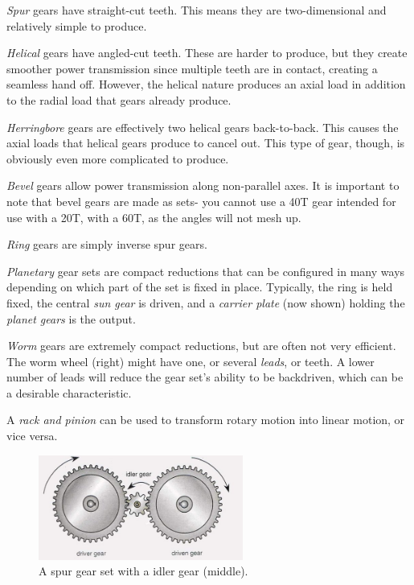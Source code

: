 \documentclass[10pt,letterpaper]{book}
\begin{document}
\begin{asparaenum}[a)]
	\item \textit{Spur} gears have straight-cut teeth. This means they are two-dimensional and relatively simple to produce.
	\item \textit{Helical} gears have angled-cut teeth. These are harder to produce, but they create smoother power transmission since multiple teeth are in contact, creating a seamless hand off. However, the helical nature produces an axial load in addition to the radial load that gears already produce. 
	\item \textit{Herringbore} gears are effectively two helical gears back-to-back. This causes the axial loads that helical gears produce to cancel out. This type of gear, though, is obviously even more complicated to produce.
	\item \textit{Bevel} gears allow power transmission along non-parallel axes. It is important to note that bevel gears are made as sets- you cannot use a 40T gear intended for use with a 20T, with a 60T, as the angles will not mesh up.
	\item \textit{Ring} gears are simply inverse spur gears.
	\item \textit{Planetary} gear sets are compact reductions that can be configured in many ways depending on which part of the set is fixed in place. Typically, the ring is held fixed, the central \textit{sun gear} is driven, and a \textit{carrier plate} (now shown) holding the \textit{planet gears} is the output.
	\item \textit{Worm} gears are extremely compact reductions, but are often not very efficient. The worm wheel (right) might have one, or several \textit{leads}, or teeth. A lower number of leads will reduce the gear set's ability to be backdriven, which can be a desirable characteristic.
	\item A \textit{rack and pinion} can be used to transform rotary motion into linear motion, or vice versa.	
\end{asparaenum}

\begin{figure}[H]
	\includegraphics[width=0.6\textwidth]{imgs/gearset_idler.jpeg}
	\caption{A spur gear set with a idler gear (middle).}
\end{figure}
\end{document}
